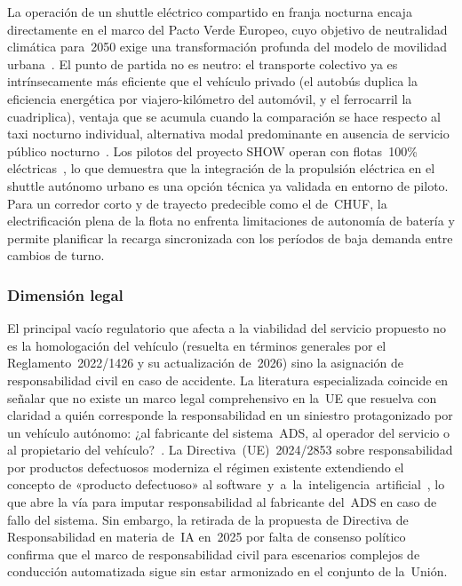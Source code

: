La operación de un shuttle eléctrico compartido en franja nocturna encaja
directamente en el marco del Pacto Verde Europeo, cuyo objetivo de
neutralidad climática para~2050 exige una transformación profunda del
modelo de movilidad urbana~\parencite{UITP2024}. El punto de partida no
es neutro: el transporte colectivo ya es intrínsecamente más eficiente
que el vehículo privado (el autobús duplica la eficiencia energética por
viajero-kilómetro del automóvil, y el ferrocarril la cuadriplica), ventaja que se acumula 
cuando la comparación se hace respecto al taxi
nocturno individual, alternativa modal predominante en ausencia de
servicio público nocturno~\parencite{UITP2024}. Los pilotos del proyecto
SHOW operan con flotas~100\% eléctricas~\parencite{SHOWd812020}, lo que
demuestra que la integración de la propulsión eléctrica en el shuttle
autónomo urbano es una opción técnica ya validada
en entorno de piloto. Para un corredor corto y de trayecto predecible
como el de~CHUF, la electrificación plena de la flota no enfrenta
limitaciones de autonomía de batería y permite planificar la recarga
sincronizada con los períodos de baja demanda entre cambios de turno.

\subsubsection{Dimensión legal}
\label{sec:pestel-legal}

El principal vacío regulatorio que afecta a la viabilidad del servicio
propuesto no es la homologación del vehículo (resuelta en términos
generales por el Reglamento~2022/1426 y su actualización de~2026) sino
la asignación de responsabilidad civil en caso de accidente. La literatura
especializada coincide en señalar que no existe un marco legal
comprehensivo en la~UE que resuelva con claridad a quién corresponde la
responsabilidad en un siniestro protagonizado por un vehículo autónomo:
¿al fabricante del sistema~ADS, al operador del servicio o al propietario
del vehículo?~\parencite{HafizAlKhafagy2025}. La Directiva~(UE)~2024/2853
sobre responsabilidad por productos defectuosos moderniza el régimen
existente extendiendo el concepto de «producto defectuoso» al
software~y~a~la~inteligencia~artificial~\parencite{DirectivaUE20242853},
lo que abre la vía para imputar responsabilidad al fabricante del~ADS en
caso de fallo del sistema. Sin embargo, la retirada de la propuesta de
Directiva de Responsabilidad en materia de~IA en~2025 por falta de
consenso político confirma que el marco de responsabilidad civil para
escenarios complejos de conducción automatizada sigue sin estar
armonizado en el conjunto de la~Unión.

